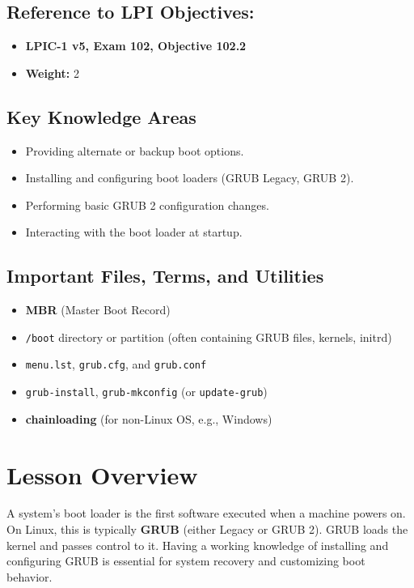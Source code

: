 \documentclass[12pt,a4paper]{report}
\begin{document}
\subsection*{Reference to LPI Objectives:}
\begin{itemize}
    \item \textbf{LPIC-1 v5, Exam 102, Objective 102.2}
    \item \textbf{Weight:} 2
\end{itemize}

\subsection*{Key Knowledge Areas}
\begin{itemize}
    \item Providing alternate or backup boot options.
    \item Installing and configuring boot loaders (GRUB Legacy, GRUB 2).
    \item Performing basic GRUB 2 configuration changes.
    \item Interacting with the boot loader at startup.
\end{itemize}

\subsection*{Important Files, Terms, and Utilities}
\begin{itemize}
    \item \textbf{MBR} (Master Boot Record)
    \item \texttt{/boot} directory or partition (often containing GRUB files, kernels, initrd)
    \item \texttt{menu.lst}, \texttt{grub.cfg}, and \texttt{grub.conf}
    \item \texttt{grub-install}, \texttt{grub-mkconfig} (or \texttt{update-grub})
    \item \textbf{chainloading} (for non-Linux OS, e.g., Windows)
\end{itemize}

\section*{Lesson Overview}

A system’s boot loader is the first software executed when a machine powers on. On Linux, this is typically \textbf{GRUB} (either Legacy or GRUB 2). GRUB loads the kernel and passes control to it. Having a working knowledge of installing and configuring GRUB is essential for system recovery and customizing boot behavior.
\end{document}
